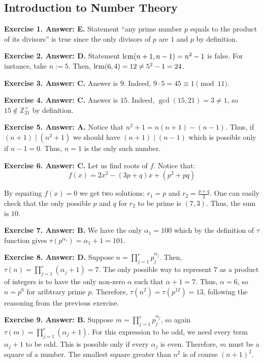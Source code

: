\documentclass[../lecture-notes-148x210.tex]{subfiles}
\begin{document}
\subsection*{Introduction to Number Theory}

\textbf{Exercise 1. Answer: E.} Statement ``any prime number $p$ equals to 
the product of its divisors'' is true since the only divisors of $p$
are $1$ and $p$ by definition.

\textbf{Exercise 2. Answer: D.} Statement $\text{lcm}(n+1,n-1)=n^2-1$ is false. For 
instance, take $n := 5$. Then, $\text{lcm}(6,4) = 12 \neq 5^2-1 = 24$. 

\textbf{Exercise 3. Answer: C.} Answer is $9$. Indeed, $9 \cdot 5 = 45 \equiv 1 \pmod{11}$.

\textbf{Exercise 4. Answer: C.} Answer is $15$. Indeed, $\gcd(15, 21) = 3 \neq 1$, so 
$15 \not\in \mathbb{Z}_{21}^{\times}$ by definition.

\textbf{Exercise 5. Answer: A.} Notice that $n^2+1=n(n+1)-(n-1)$. Thus, if 
$(n+1)\mid(n^2+1)$ we should have $(n+1)\mid (n-1)$ which is possible 
only if $n-1=0$. Thus, $n=1$ is the only such number.

\textbf{Exercise 6. Answer: C.} Let us find roots of $f$. Notice that:
\begin{equation*}
    f(x) = 2x^2 - (3p+q)x + (p^2 + pq)
\end{equation*}

By equating $f(x)=0$ we get two solutions: $r_1 = p$ and $r_2=\frac{p+q}{2}$. One 
can easily check that the only possible $p$ and $q$ for $r_2$ to be prime is $(7,3)$.
Thus, the sum is $10$.

\textbf{Exercise 7. Answer: B.} We have the only $\alpha_1=100$ which 
by the definition of $\tau$ function gives $\tau(p^{\alpha_1})=\alpha_1+1=101$.

\textbf{Exercise 8. Answer: D.} Suppose $n=\prod_{j=1}^r p_j^{\alpha_j}$. Then,
$\tau(n) = \prod_{j=1}^r (\alpha_j+1) = 7$. The only possible way to represent $7$
as a product of integers is to have the only non-zero $\alpha$ such that $\alpha+1=7$.
Thus, $\alpha=6$, so $n=p^6$ for aribtrary prime $p$. Therefore, $\tau(n^2)=\tau(p^{12})=13$, 
following the reasoning from the previous exercise.

\textbf{Exercise 9. Answer: B.} Suppose $m=\prod_{j=1}^rp_j^{\alpha_j}$, so 
again $\tau(m) = \prod_{j=1}^r (\alpha_j+1)$. For this expression to be odd, we 
need every term $\alpha_j+1$ to be odd. This is possible only if every $\alpha_j$ is even.
Therefore, $m$ must be a square of a number. The smallest square greater than $n^2$ is 
of course $(n+1)^2$.
\end{document}
